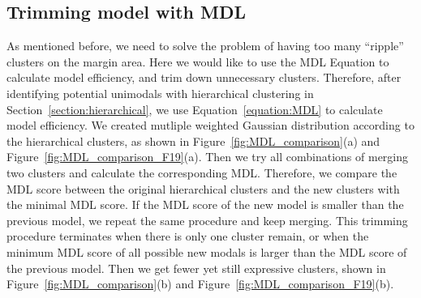 \subsection{Trimming model with MDL}
As mentioned before, we need to solve the problem of having too many ``ripple'' clusters on the margin area.
Here we would like to use the MDL Equation to calculate model efficiency, and trim down unnecessary clusters.
Therefore, after identifying potential unimodals with hierarchical clustering in Section~\ref{section:hierarchical},
we use Equation~\ref{equation:MDL} to calculate model efficiency.
We created mutliple weighted Gaussian distribution according to the hierarchical clusters, 
as shown in Figure~\ref{fig:MDL_comparison}(a) and Figure~\ref{fig:MDL_comparison_F19}(a).
Then we try all combinations of merging two clusters and calculate the corresponding MDL.
Therefore, we compare the MDL score between the original hierarchical clusters and the new clusters with the minimal MDL score.
If the MDL score of the new model is smaller than the previous model, we repeat the same procedure and keep merging.
This trimming procedure terminates when there is only one cluster remain, or when the minimum MDL score of all possible new modals is larger than the MDL score of the previous model.
Then we get fewer yet still expressive clusters, 
shown in Figure~\ref{fig:MDL_comparison}(b) and Figure~\ref{fig:MDL_comparison_F19}(b).
















